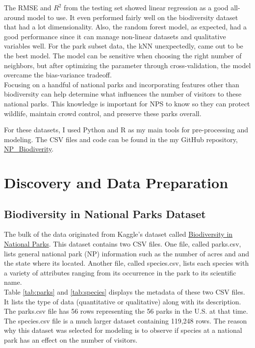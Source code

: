 \documentclass[stu, floatsintext, 11pt]{apa7}
\begin{document}
The RMSE and $R^2$ from the testing set showed linear regression as a good all-around model to use. It even performed fairly well on the biodiversity dataset that had a lot dimensionality. Also, the random forest model, as expected, had a good performance since it can manage non-linear datasets and qualitative variables well. For the park subset data, the kNN unexpectedly, came out to be the best model. The model can be sensitive when choosing the right number of neighbors, but after optimizing the parameter through cross-validation, the model overcame the bias-variance tradeoff. \\

Focusing on a handful of national parks and incorporating  features other than biodiversity can help determine what influences the number of visitors to these national parks. This knowledge is important for NPS to know so they can protect wildlife, maintain crowd control, and preserve these parks overall.

For these datasets, I used Python and R as my main tools for pre-processing and modeling. The CSV files and code can be found in the my GitHub repository, \href{https://github.com/ohkaaaaay/NP_Biodiversity}{NP\_Biodiverity}.

\section{Discovery and Data Preparation}

\subsection{Biodiversity in National Parks Dataset}
The bulk of the data originated from Kaggle's dataset called \href{https://www.kaggle.com/nationalparkservice/park-biodiversity}{Biodiversity in National Parks}. This dataset contains two CSV files. One file, called parks.csv, lists general national park (NP) information such as the number of acres and and the state where its located. Another file, called species.csv, lists each species with a variety of attributes ranging from its occurrence in the park to its scientific name. \\

Table \ref{tab:parks} and \ref{tab:species} displays the metadata of these two CSV files. It lists the type of data (quantitative or qualitative) along with its description. The parks.csv file has 56 rows representing the 56 parks in the U.S. at that time. The species.csv file is a much larger dataset containing 119,248 rows. The reason why this dataset was selected for modeling is to observe if species at a national park has an effect on the number of visitors.
\end{document}
